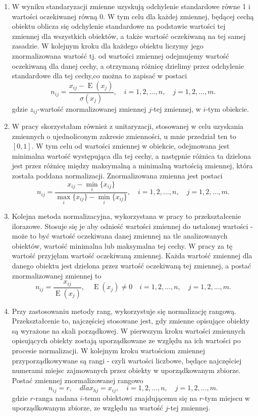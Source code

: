 \documentclass[12pt,a4paper]{report}
\newcommand{\Ex}{\operatorname{E}}
\begin{document}
\begin{enumerate}
\item W wyniku standaryzacji zmienne uzyskują odchylenie standardowe równe 1 i wartości oczekiwanej  równą 0. W tym celu dla każdej zmiennej, będącej cechą obiektu oblicza się odchylenie standardowe na podstawie wartości tej zmiennej dla wszystkich obiektów, a także wartość oczekiwaną na tej samej zasadzie. W kolejnym kroku dla każdego obiektu liczymy jego znormalizowana wartość tj. od wartości zmiennej odejmujemy wartość oczekiwaną dla danej cechy, a otrzymaną różnicę dzielimy przez odchylenie standardowe dla tej cechy,co można to zapisać w postaci
$$
n_{ij}=\frac{x_{ij} - \Ex (x_j)}{\sigma(x_j)}, \quad i = 1,2, \ldots, n, \quad j=1,2,\ldots, m.
$$
gdzie
$z_{ij}$-wartość znormalizowanej zmiennej $j$-tej zmiennej, w $i$-tym obiekcie.


\item W pracy skorzystałam również z unitaryzacji, stosowanej w celu uzyskania zmiennych o ujednoliconym zakresie zmienności, u mnie przedział ten to $[0,1]$. W tym celu od wartości zmiennej w obiekcie, odejmowana jest minimalna wartość występująca dla tej cechy, a następnie różnica ta dzielona jest przez różnicę między maksymalną a minimalną wartością zmiennej, która została poddana normalizacji. Znormalizowana zmienna jest postaci
$$
n_{ij}=\frac{x_{ij} - \min\limits_{i}\{x_{ij}\}}{\max\limits_{i} \{x_{ij}\} - \min\limits_{i} \{x_{ij}\}}, \quad i = 1,2, \ldots, n, \quad j=1,2,\ldots, m. 
$$
\item Kolejna metoda normalizacyjna, wykorzystana w pracy to przekształcenie ilorazowe. Stosuje się  je aby odnieść wartości zmiennej do ustalonej wartości - może to być wartość oczekiwana danej zmiennej na tle analizowanych obiektów, wartość minimalna lub maksymalna tej cechy. W pracy za tę wartość przyjęłam wartość oczekiwaną zmiennej. Każda wartość zmiennej dla danego obiektu jest dzielona przez wartość oczekiwaną tej zmiennej, a postać znormalizowanej zmiennej to
$$
n_{ij}=\frac{x_{ij}}{\Ex (x_j)}, \quad \Ex (x_j) \neq 0 \quad i = 1,2, \ldots, n, \quad j=1,2,\ldots, m.
$$ 
\item Przy zastosowaniu metody rang, wykorzystuje się normalizację rangową. Przekształcenie to, najczęściej stosowane jest, gdy zmienne opisujące obiekty są wyrażone na skali porządkowej. W pierwszym kroku wartości zmiennych opisujących obiekty zostają uporządkowane ze względu na ich wartości po procesie normalizacji. W kolejnym kroku wartościom zmiennej przyporządkowywane są rangi - czyli wartości liczbowe, będące najczęściej numerami miejsc zajmowanych przez obiekty w uporządkowanym zbiorze. Postać zmiennej znormalizowanej rangowo
$$
n_{ij}=r, \quad dla x_{hj}=x_{ij}, \quad i = 1,2, \ldots, n, \quad j=1,2,\ldots, m.
$$
gdzie 
$r$-ranga nadana $i$-temu obiektowi znajdującemu się na $r$-tym miejscu w uporządkowanym zbiorze, ze względu na wartość $j$-tej zmiennej. 
\end{enumerate}
\end{document}
